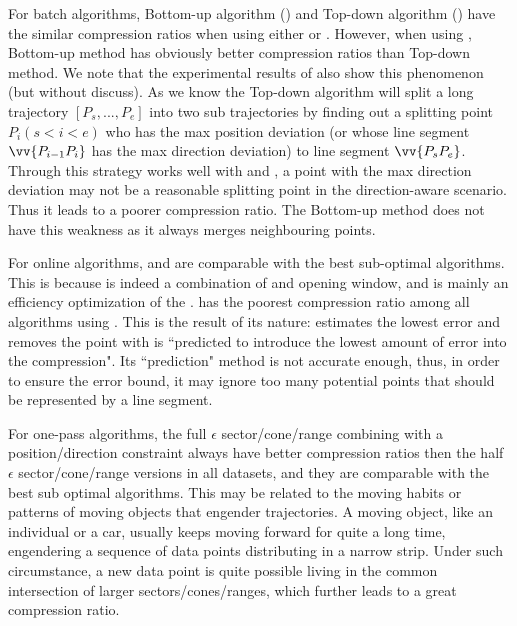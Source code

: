 For batch algorithms, Bottom-up algorithm (\tpa) and Top-down algorithm (\dpa) have the similar compression ratios when using either \ped or \sed. However, when using \dad, Bottom-up method has obviously better compression ratios than Top-down method. We note that the experimental results of \cite{Long:Direction} also show this phenomenon (but without discuss). As we know the Top-down algorithm will split a long trajectory $[P_s, ..., P_e]$ into two sub trajectories by finding out a splitting point $P_i (s<i<e)$ who has the max position deviation (or whose line segment $\vv{P_{i-1}P_{i}}$ has the max direction deviation) to line segment $\vv{P_sP_{e}}$. Through this strategy works well with \ped and \sed, a point with the max direction deviation may not be a reasonable splitting point in the direction-aware scenario. Thus it leads to a poorer compression ratio. The Bottom-up method does not have this weakness as it always merges neighbouring points.



For online algorithms, \bqsa and \opwa are comparable with the best sub-optimal algorithms. This is because \opwa is indeed a combination of \dpa and opening window, and \bqsa is mainly an efficiency optimization of the \opwa.
\squishe has the poorest compression ratio among all algorithms using \sed. This is the result of its nature: \squishe estimates the lowest \sed error and removes the point with is ``predicted to introduce the lowest amount of error into the compression"\cite{Muckell:SQUISH}. Its ``prediction" method is not accurate enough, thus, in order to ensure the error bound, it may ignore too many potential points that should be represented by a line segment.

For one-pass algorithms, the full $\epsilon$ sector/cone/range combining with a position/direction constraint always have better compression ratios then the half $\epsilon$ sector/cone/range versions in all datasets, and they are comparable with the best sub optimal algorithms.
This may be related to the moving habits or patterns of moving objects that engender trajectories.
A moving object, like an individual or a car, usually keeps moving forward for quite a long time, engendering a sequence of data points distributing in a narrow strip. Under such circumstance, a new data point is quite possible living in the common intersection of larger sectors/cones/ranges, which further leads to a great compression ratio.



